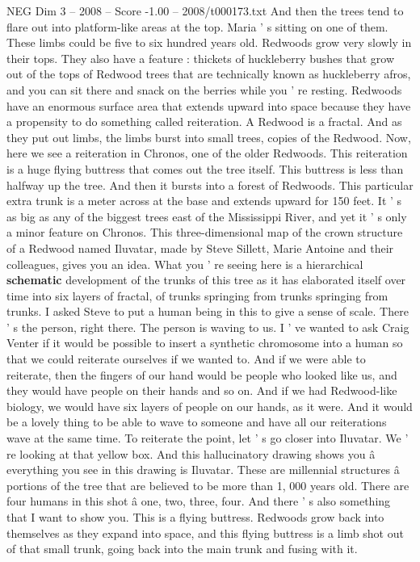 \begin{textsample}{NEG Dim 3 – 2008 – Score -1.00 – 2008/t000173.txt}
And then the trees tend to flare out into platform-like areas at the top.
Maria ' s sitting on one of them.
These limbs could be five to six hundred years old.
Redwoods grow very slowly in their tops.
They also have a feature : thickets of huckleberry bushes that grow out of the tops of Redwood trees that are technically known as huckleberry afros, and you can sit there and snack on the berries while you ' re resting.
Redwoods have an enormous surface area that extends upward into space because they have a propensity to do something called reiteration.
A Redwood is a fractal.
And as they put out limbs, the limbs burst into small trees, copies of the Redwood.
Now, here we see a reiteration in Chronos, one of the older Redwoods.
This reiteration is a huge flying buttress that comes out the tree itself.
This buttress is less than halfway up the tree.
And then it bursts into a forest of Redwoods.
This particular extra trunk is a meter across at the base and extends upward for 150 feet.
It ' s as big as any of the biggest trees east of the Mississippi River, and yet it ' s only a minor feature on Chronos.
This three-dimensional map of the crown structure of a Redwood named Iluvatar, made by Steve Sillett, Marie Antoine and their colleagues, gives you an idea.
What you ' re seeing here is a hierarchical \textbf{schematic} development of the trunks of this tree as it has elaborated itself over time into six layers of fractal, of trunks springing from trunks springing from trunks.
I asked Steve to put a human being in this to give a sense of scale.
There ' s the person, right there.
The person is waving to us.
I ' ve wanted to ask Craig Venter if it would be possible to insert a synthetic chromosome into a human so that we could reiterate ourselves if we wanted to.
And if we were able to reiterate, then the fingers of our hand would be people who looked like us, and they would have people on their hands and so on.
And if we had Redwood-like biology, we would have six layers of people on our hands, as it were.
And it would be a lovely thing to be able to wave to someone and have all our reiterations wave at the same time.
To reiterate the point, let ' s go closer into Iluvatar.
We ' re looking at that yellow box.
And this hallucinatory drawing shows you â everything you see in this drawing is Iluvatar.
These are millennial structures â portions of the tree that are believed to be more than 1, 000 years old.
There are four humans in this shot â one, two, three, four.
And there ' s also something that I want to show you.
This is a flying buttress.
Redwoods grow back into themselves as they expand into space, and this flying buttress is a limb shot out of that small trunk, going back into the main trunk and fusing with it.

\end{textsample}

